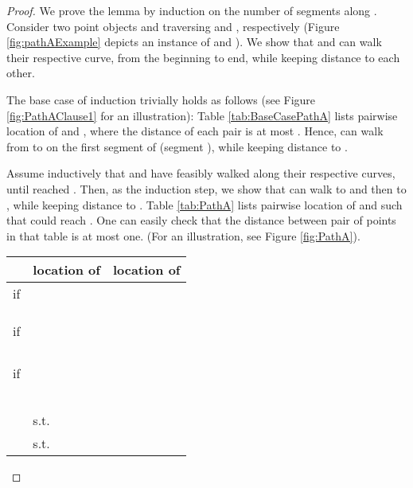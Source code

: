 \documentclass[a4paper,UKenglish]{lipics}
\begin{document}
\begin{proof}

We prove the lemma by induction on the number of segments along . 
Consider two point objects  and  
traversing  and , respectively (Figure \ref{fig:pathAExample} depicts an instance of  and ).
We show that  and  can walk
their respective curve, from the beginning to
 end, while keeping distance  to each other. 

The base case of induction trivially holds as follows 
(see Figure \ref{fig:PathAClause1} for an illustration):
Table \ref{tab:BaseCasePathA} lists  pairwise location of 
 and , where the distance of each pair is at most .
Hence,  can walk from  to  on the 
first segment of  (segment ), 
while keeping distance  to .


Assume inductively that  and  have feasibly walked along 
their respective curves, until  reached .
Then, as the induction step, 
we 
show that
 can walk to  and then to  
, while keeping distance  to .
Table \ref{tab:PathA} lists pairwise location 
of  and  such that  could reach  .
One can easily check that the distance between pair of points 
in that table is at most one.
 (For an illustration, see Figure \ref{fig:PathA}). 


\begin{table}[h]
\centering
\begin{tabular}{ r | l | l  }
  & location of  & location of   
 \\
\hline
   if   &  & \\
	&  & \\ 
	&  & \\ 

	&  &  \\





   if   &  &  \\
	&  &\\
	&  &\\
	& &\\
	&  &\\




   if   &  & \\
	&  & \\
	&  & \\

	& &\\
	& &\\
&  &  \\

\hline
	&   s.t.   & \\
	&  	 s.t.   & \\






\end{tabular}
\end{table}
\end{proof}
\end{document}
